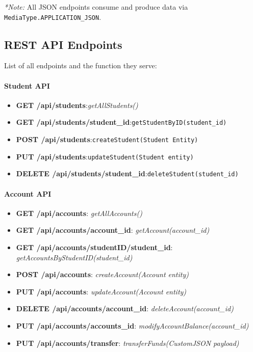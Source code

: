 \documentclass[12pt]{article}
\begin{document}
\begin{center}
\end{center}

\vspace{1em}
\noindent \textit{*Note:} All JSON endpoints consume and produce data via \texttt{MediaType.APPLICATION\_JSON}.

\subsection{REST API Endpoints}
List of all endpoints and the function they serve:
\paragraph{Student API}
\begin{itemize}
	\item \textbf{GET /api/students}:\textit{getAllStudents()}
	\item \textbf{GET /api/students/{student\_id}}:\texttt{getStudentByID(student\_id)}
	\item \textbf{POST /api/students}:\texttt{createStudent(Student Entity)}
	\item \textbf{PUT /api/students}:\texttt{updateStudent(Student entity)}
	\item \textbf{DELETE /api/students/{student\_id}}:\texttt{deleteStudent(student\_id)}
\end{itemize}
\paragraph{Account API}
\begin{itemize}
	\item \textbf{GET /api/accounts}: \textit{getAllAccounts()}
	\item \textbf{GET /api/accounts/{account\_id}}: \textit{getAccount(account\_id)}
	\item \textbf{GET /api/accounts/studentID/{student\_id}}: \textit{getAccountsByStudentID(student\_id)}
	\item \textbf{POST /api/accounts}: \textit{createAccount(Account entity)}
	\item \textbf{PUT /api/accounts}: \textit{updateAccount(Account entity)}
	\item \textbf{DELETE /api/accounts/{account\_id}}: \textit{deleteAccount(account\_id)}
	\item \textbf{PUT /api/accounts/{accounts\_id}}: \textit{modifyAccountBalance(account\_id)}
	\item \textbf{PUT /api/accounts/transfer}: \textit{transferFunds(CustomJSON payload)}
\end{itemize}
\end{document}
